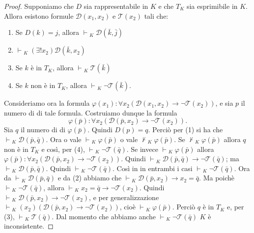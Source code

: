 \begin{proof}
Supponiamo che $D$ sia rappresentabile in $K$ e che $T_K$ sia esprimibile in $K$.
Allora esistono formule $\mathcal{D}(x_1,x_2)$ e $\mathcal{T}(x_2)$ tali che:
\begin{enumerate}
 \item Se $D(k)=j$, allora $\vdash \!\! _K \; \mathcal{D}(\bar{k},\bar{j})$
 \item $\vdash \!\! _K \; (\exists!x_2)\mathcal{D}(\bar{k},x_2)$
 \item Se $k$ è in $T_K$, allora  $\vdash \!\! _K \; \mathcal{T}(\bar{k})$
 \item Se $k$ non è in $T_K$, allora  $\vdash \!\! _K \; \neg \mathcal{T}(\bar{k})$.
\end{enumerate}
Consideriamo ora la formula $\varphi(x_1):\forall x_2(\mathcal{D}(x_1,x_2) \rightarrow \neg \mathcal{T}(x_2))$,
e sia $p$ il numero di \godel di tale formula. Costruiamo dunque la formula 
$$\varphi(\bar{p}): \forall x_2(\mathcal{D}(\bar{p},x_2) \rightarrow \neg \mathcal{T}(x_2)).$$
Sia $q$ il numero di \godel di $\varphi(\bar{p})$. Quindi $D(p)=q$. Perciò per (1)
si ha che $\vdash \!\! _K \; \mathcal{D}(\bar{p},\bar{q})$. Ora o vale $\vdash \!\! _K \; \varphi(\bar{p})$
o vale $\nvdash \!\! _K \; \varphi(\bar{p})$.\newline
Se $\nvdash \!\! _K \; \varphi(\bar{p})$ allora $q$ non è in $T_K$ e così, per (4), $\vdash \!\! _K \; 
\neg \mathcal{T}(\bar{q})$. \newline
Se invece $\vdash \!\! _K \; \varphi(\bar{p})$ allora
 $\varphi(\bar{p}): \forall x_2(\mathcal{D}(\bar{p},x_2) \rightarrow \neg \mathcal{T}(x_2))$. \newline
Quindi $\vdash \!\! _K \; \mathcal{D}(\bar{p},\bar{q}) \rightarrow \neg \mathcal{T}(\bar{q})$; ma
$\vdash \!\! _K \; \mathcal{D}(\bar{p},\bar{q})$.
 Quindi $\vdash \!\! _K \; \neg \mathcal{T}(\bar{q})$. \newline
Così in in entrambi i casi $\vdash \!\! _K \; \neg \mathcal{T}(\bar{q})$. \newline
Ora da $\vdash \!\! _K \; \mathcal{D}(\bar{p},\bar{q})$ e da (2) abbiamo che
$\vdash \!\! _K \; \mathcal{D}(\bar{p},x_2) \rightarrow x_2 = \bar{q}$.
Ma poichè $\vdash \!\! _K \; \neg \mathcal{T}(\bar{q})$, allora
$\vdash \!\! _K \; x_2 = \bar{q} \rightarrow \neg \mathcal{T}(x_2)$.
Quindi $\vdash \!\! _K \; \mathcal{D}(\bar{p},x_2) \rightarrow \neg \mathcal{T}(x_2)$, e
per generalizzazione $\vdash \!\! _K \; (x_2)(\mathcal{D}(\bar{p},x_2) \rightarrow \neg \mathcal{T}(x_2))$,
cioè $\vdash \!\! _K \; \varphi(\bar{p})$. Perciò $q$ è in $T_K$ e, per (3),
 $\vdash \!\! _K \; \mathcal{T}(\bar{q})$. Dal momento che abbiamo anche 
$\vdash \!\! _K \; \neg \mathcal{T}(\bar{q})$ $K$ è inconsistente.
\end{proof}

